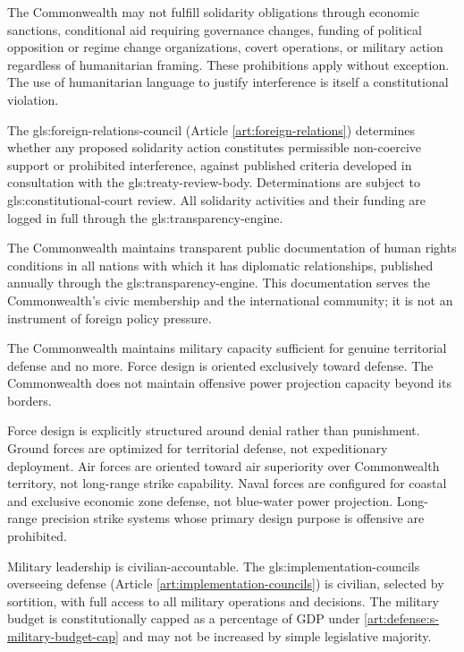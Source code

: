 The Commonwealth may not fulfill solidarity obligations through economic sanctions, conditional aid requiring governance changes, funding of political opposition or regime change organizations, covert operations, or military action regardless of humanitarian framing. These prohibitions apply without exception. The use of humanitarian language to justify interference is itself a constitutional violation.

The \gls{gls:foreign-relations-council} (Article \ref{art:foreign-relations}) determines whether any proposed solidarity action constitutes permissible non-coercive support or prohibited interference, against published criteria developed in consultation with the \gls{gls:treaty-review-body}. Determinations are subject to \gls{gls:constitutional-court} review. All solidarity activities and their funding are logged in full through the \gls{gls:transparency-engine}.

The Commonwealth maintains transparent public documentation of human rights conditions in all nations with which it has diplomatic relationships, published annually through the \gls{gls:transparency-engine}. This documentation serves the Commonwealth's civic membership and the international community; it is not an instrument of foreign policy pressure.


The Commonwealth maintains military capacity sufficient for genuine territorial defense and no more. Force design is oriented exclusively toward defense. The Commonwealth does not maintain offensive power projection capacity beyond its borders.

Force design is explicitly structured around denial rather than punishment. Ground forces are optimized for territorial defense, not expeditionary deployment. Air forces are oriented toward air superiority over Commonwealth territory, not long-range strike capability. Naval forces are configured for coastal and exclusive economic zone defense, not blue-water power projection. Long-range precision strike systems whose primary design purpose is offensive are prohibited.

Military leadership is civilian-accountable. The \gls{gls:implementation-councils} overseeing defense (Article \ref{art:implementation-councils}) is civilian, selected by sortition, with full access to all military operations and decisions. The military budget is constitutionally capped as a percentage of GDP under \ref{art:defense:s-military-budget-cap} and may not be increased by simple legislative majority.

